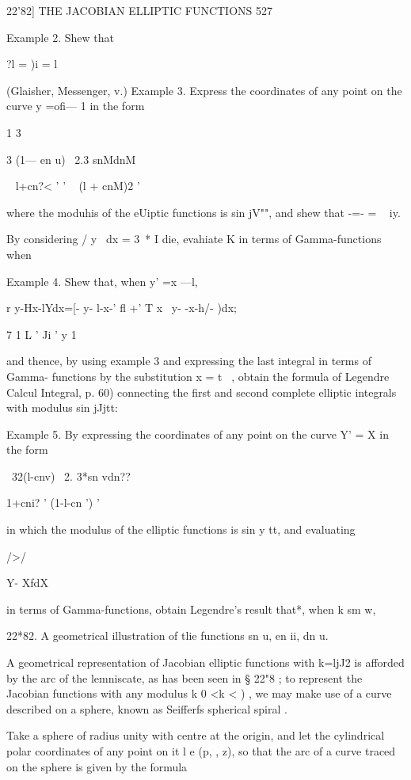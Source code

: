 22'82] THE JACOBIAN ELLIPTIC FUNCTIONS 527 

Example 2. Shew that 

?l = )i = l 

(Glaisher, Messenger, v.) 
Example 3. Express the coordinates of any point on the curve y =ofi— 1 in the form 

1 3 

3  (1— en u) \ 2.3 snMdnM 

 ~ l+cn?< ' ' ~ (l + cnM)2 ' 

where the moduhis of the eUiptic functions is sin jV"", and shew that -=- = ~ iy. 

By considering / y~ dx = 3~* I die, evahiate K in terms of Gamma-functions when 

Example 4. Shew that, when y' =x —l, 

r y-Hx-lYdx=[- y-   l-x-' fl +'  T  x~ y- -x-h/- )dx; 

7 1 L '  Ji ' y 1 

and thence, by using example 3 and expressing the last integral in terms of Gamma- 
functions by the substitution x = t~ , obtain the formula of Legendre  Calcul Integral, 
p. 60) connecting the first and second complete elliptic integrals with modulus sin jJjtt: 

Example 5. By expressing the coordinates of any point on the curve Y' = X  in 
the form 

 \  32(l-cnv) \  2. 3*sn vdn?? 

1+cni? ' (1-l-cn ')  ' 

in which the modulus of the elliptic functions is sin y tt, and evaluating 



 />/  



Y-  XfdX 



in terms of Gamma-functions, obtain Legendre's result that*, when k sm w, 

22*82. A geometrical illustration of tlie functions sn u, en ii, dn u. 

A geometrical representation of Jacobian elliptic functions with k=ljJ2 is afforded by 
the arc of the lemniscate, as has been seen in § 22"8 ; to represent the Jacobian functions 
with any modulus k  0 <k < ) , we may make use of a curve described on a sphere, known 
as Seifferfs spherical spiral . 

Take a sphere of radius unity with centre at the origin, and let the cylindrical polar 
coordinates of any point on it l e (p,  , z), so that the arc of a curve traced on the sphere 
is given by the formula \ 

